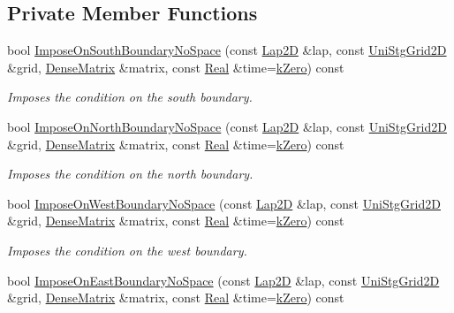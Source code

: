 \subsection*{Private Member Functions}
\begin{DoxyCompactItemize}
\item 
bool \hyperlink{classmtk_1_1RobinBCDescriptor2D_a82159bcca93555114532c5fa4d0fb3db}{Impose\+On\+South\+Boundary\+No\+Space} (const \hyperlink{classmtk_1_1Lap2D}{Lap2\+D} \&lap, const \hyperlink{classmtk_1_1UniStgGrid2D}{Uni\+Stg\+Grid2\+D} \&grid, \hyperlink{classmtk_1_1DenseMatrix}{Dense\+Matrix} \&matrix, const \hyperlink{group__c01-roots_gac080bbbf5cbb5502c9f00405f894857d}{Real} \&time=\hyperlink{group__c01-roots_ga59a451a5fae30d59649bcda274fea271}{k\+Zero}) const 
\begin{DoxyCompactList}\small\item\em Imposes the condition on the south boundary. \end{DoxyCompactList}\item 
bool \hyperlink{classmtk_1_1RobinBCDescriptor2D_a3bc22c1d5a7a4d7c2130351cbfa35135}{Impose\+On\+North\+Boundary\+No\+Space} (const \hyperlink{classmtk_1_1Lap2D}{Lap2\+D} \&lap, const \hyperlink{classmtk_1_1UniStgGrid2D}{Uni\+Stg\+Grid2\+D} \&grid, \hyperlink{classmtk_1_1DenseMatrix}{Dense\+Matrix} \&matrix, const \hyperlink{group__c01-roots_gac080bbbf5cbb5502c9f00405f894857d}{Real} \&time=\hyperlink{group__c01-roots_ga59a451a5fae30d59649bcda274fea271}{k\+Zero}) const 
\begin{DoxyCompactList}\small\item\em Imposes the condition on the north boundary. \end{DoxyCompactList}\item 
bool \hyperlink{classmtk_1_1RobinBCDescriptor2D_af5dd24444e7eb14592a3c3feaf30d561}{Impose\+On\+West\+Boundary\+No\+Space} (const \hyperlink{classmtk_1_1Lap2D}{Lap2\+D} \&lap, const \hyperlink{classmtk_1_1UniStgGrid2D}{Uni\+Stg\+Grid2\+D} \&grid, \hyperlink{classmtk_1_1DenseMatrix}{Dense\+Matrix} \&matrix, const \hyperlink{group__c01-roots_gac080bbbf5cbb5502c9f00405f894857d}{Real} \&time=\hyperlink{group__c01-roots_ga59a451a5fae30d59649bcda274fea271}{k\+Zero}) const 
\begin{DoxyCompactList}\small\item\em Imposes the condition on the west boundary. \end{DoxyCompactList}\item 
bool \hyperlink{classmtk_1_1RobinBCDescriptor2D_ae1df82802d541d3566f3d2659e4aaf05}{Impose\+On\+East\+Boundary\+No\+Space} (const \hyperlink{classmtk_1_1Lap2D}{Lap2\+D} \&lap, const \hyperlink{classmtk_1_1UniStgGrid2D}{Uni\+Stg\+Grid2\+D} \&grid, \hyperlink{classmtk_1_1DenseMatrix}{Dense\+Matrix} \&matrix, const \hyperlink{group__c01-roots_gac080bbbf5cbb5502c9f00405f894857d}{Real} \&time=\hyperlink{group__c01-roots_ga59a451a5fae30d59649bcda274fea271}{k\+Zero}) const 

\end{DoxyCompactItemize}
